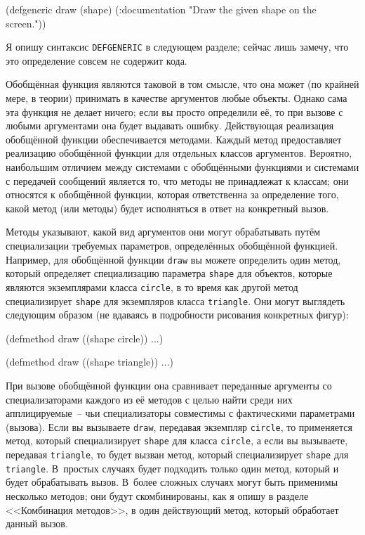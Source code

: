 \begin{myverb}
(defgeneric draw (shape)
  (:documentation "Draw the given shape on the screen."))
\end{myverb}

Я опишу синтаксис \lstinline{DEFGENERIC} в следующем разделе; сейчас лишь замечу, что это
определение совсем не содержит кода.

Обобщённая функция являются таковой в том смысле, что она может (по крайней мере, в теории)
принимать в качестве аргументов любые объекты.  Однако
сама эта функция не делает ничего; если вы просто определили её, то при вызове с любыми
аргументами она будет выдавать ошибку. Действующая реализация обобщённой функции
обеспечивается методами. Каждый метод предоставляет реализацию обобщённой функции для
отдельных классов аргументов.  Вероятно, наибольшим отличием между системами с обобщёнными
функциями и системами с передачей сообщений является то, что методы не принадлежат к
классам; они относятся к обобщённой функции, которая ответственна за определение того,
какой метод (или методы) будет исполняться в ответ на конкретный вызов.

Методы указывают, какой вид аргументов они могут обрабатывать путём специализации
требуемых параметров, определённых обобщённой функцией.  Например, для обобщённой функции
\lstinline{draw} вы можете определить один метод, который определяет специализацию параметра
\lstinline{shape} для объектов, которые являются экземплярами класса \lstinline{circle}, в то время
как другой метод специализирует \lstinline{shape} для экземпляров класса \lstinline{triangle}.  Они
могут выглядеть следующим образом (не вдаваясь в подробности рисования конкретных фигур):

\begin{myverb}
(defmethod draw ((shape circle))
  ...)

(defmethod draw ((shape triangle))
  ...)
\end{myverb}

При вызове обобщённой функции она сравнивает переданные аргументы со спе\-циа\-ли\-за\-то\-ра\-ми
каждого из её методов с целью найти среди них апплицируемые~-- чьи специализаторы
совместимы с фактическими параметрами (вызова). Если вы вы\-зы\-вае\-те \lstinline{draw}, передавая
экземпляр \lstinline{circle}, то применяется метод, который специализирует \lstinline{shape} для
класса \lstinline{circle}, а если вы вызываете, передавая \lstinline{triangle}, то будет вызван
метод, который специализирует \lstinline{shape} для \lstinline{triangle}.  В~простых случаях будет
подходить только один метод, который и будет обрабатывать вызов.  В~более сложных случаях
могут быть применимы несколько методов; они будут скомбинированы, как я опишу в разделе
<<Комбинация методов>>, в один действующий метод, который обработает данный вызов.

